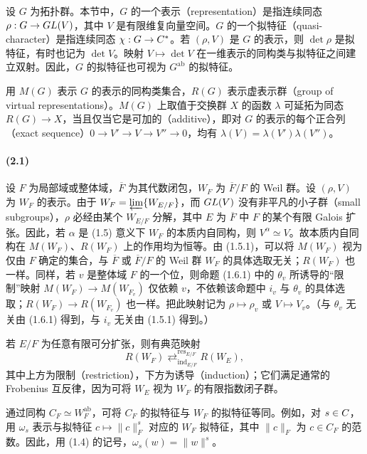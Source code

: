 设 $G$ 为拓扑群。本节中，$G$ 的一个表示（representation）是指连续同态 $\rho:G\to GL(V)$，其中 $V$ 是有限维复向量空间。$G$ 的一个拟特征（quasi-character）是指连续同态 $\chi:G\to C^*$。若 $(\rho,V)$ 是 $G$ 的表示，则 $\det\rho$ 是拟特征，有时也记为 $\det V$。映射 $V\mapsto\det V$ 在一维表示的同构类与拟特征之间建立双射。因此，$G$ 的拟特征也可视为 $G^{\mathrm{ab}}$ 的拟特征。

用 $M(G)$ 表示 $G$ 的表示的同构类集合，$R(G)$ 表示虚表示群（group of virtual representations）。$M(G)$ 上取值于交换群 $X$ 的函数 $\lambda$ 可延拓为同态 $R(G)\to X$，当且仅当它是可加的（additive），即对 $G$ 的表示的每个正合列（exact sequence）$0\to V'\to V\to V''\to0$，均有 $\lambda(V)=\lambda(V')\lambda(V'')$。

\paragraph*{(2.1)} 设 $F$ 为局部域或整体域，$\overline F$ 为其代数闭包，$W_F$ 为 $\overline F/F$ 的 Weil 群。设 $(\rho,V)$ 为 $W_F$ 的表示。由于 $W_F=\varprojlim\{W_{E/F}\}$，而 $GL(V)$ 没有非平凡的小子群（small subgroups），$\rho$ 必经由某个 $W_{E/F}$ 分解，其中 $E$ 为 $\overline F$ 中 $F$ 的某个有限 Galois 扩张。因此，若 $\alpha$ 是 (1.5) 意义下 $W_F$ 的本质内自同构，则 $V^\alpha\simeq V$。故本质内自同构在 $M(W_F)$、$R(W_F)$ 上的作用均为恒等。由 (1.5.1)，可以将 $M(W_F)$ 视为仅由 $F$ 确定的集合，与 $\overline F$ 或 $\overline F/F$ 的 Weil 群 $W_F$ 的具体选取无关；$R(W_F)$ 也一样。同样，若 $v$ 是整体域 $F$ 的一个位，则命题 (1.6.1) 中的 $\theta_v$ 所诱导的“限制”映射 $M(W_F)\to M(W_{F_v})$ 仅依赖 $v$，不依赖该命题中 $i_v$ 与 $\theta_v$ 的具体选取；$R(W_F)\to R(W_{F_v})$ 也一样。把此映射记为 $\rho\mapsto\rho_v$ 或 $V\mapsto V_v$。（与 $\theta_v$ 无关由 (1.6.1) 得到，与 $i_v$ 无关由 (1.5.1) 得到。）

若 $E/F$ 为任意有限可分扩张，则有典范映射
\[
 R(W_F)\mathrel{\mathop{\rightleftarrows}^{\operatorname{res}_{E/F}}_{\operatorname{ind}_{E/F}}}R(W_E),
\]
其中上方为限制（restriction），下方为诱导（induction）；它们满足通常的 Frobenius 互反律，因为可将 $W_E$ 视为 $W_F$ 的有限指数闭子群。

通过同构 $C_F\simeq W_F^{\mathrm{ab}}$，可将 $C_F$ 的拟特征与 $W_F$ 的拟特征等同。例如，对 $s\in C$，用 $\omega_s$ 表示与拟特征 $c\mapsto\lVert c\rVert_F^s$ 对应的 $W_F$ 拟特征，其中 $\lVert c\rVert_F$ 为 $c\in C_F$ 的范数。因此，用 (1.4) 的记号，$\omega_s(w)=\lVert w\rVert^s$。

